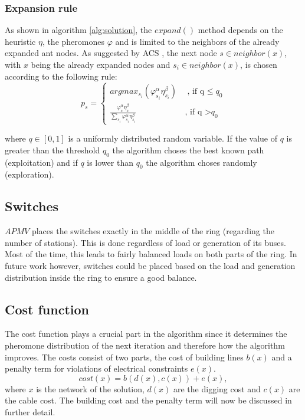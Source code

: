 \subsubsection{Expansion rule}
As shown in algorithm \ref{alg:solution}, the $expand()$ method depends on the heuristic $\eta$, the pheromones $\varphi$ and is limited to the neighbors of the already expanded ant nodes. As suggested by ACS \cite{ant_coloy_system}, the next node $s \in neighbor(x)$, with $x$ being the already expanded nodes and $s_i \in neighbor(x)$, is chosen according to the following rule:
$$p_s = \begin{cases}
	argmax_{s_i}(\varphi_{s_i}^\alpha \eta_{s_i}^\beta) & \, \text{, if q $\leq$} q_0\\
	\frac{\varphi_s^\alpha\eta_s^\beta}{\sum_{s_i}\varphi_{s_i}^\alpha\eta_{s_i}^\beta} & \, \text{, if q >} q_0
\end{cases}$$

where $q \in [0,1]$ is a uniformly distributed random variable. If the value of $q$ is greater than the threshold $q_0$ the algorithm choses the best known path (exploitation) and if $q$ is lower than $q_0$ the algorithm choses randomly (exploration). 

\subsection{Switches}
$APMV$ places the switches exactly in the middle of the ring (regarding the number of stations). This is done regardless of load or generation of its buses. Most of the time, this leads to fairly balanced loads on both parts of the ring. In future work however, switches could be placed based on the load and generation distribution inside the ring to ensure a good balance.

\subsection{Cost function}
The cost function plays a crucial part in the algorithm since it determines the pheromone distribution of the next iteration and therefore how the algorithm improves. The costs consist of two parts, the cost of building lines $b(x)$ and a penalty term for violations of electrical constraints $e(x)$.
$$cost(x) = b(d(x), c(x)) + e(x),$$
where $x$ is the network of the solution, $d(x)$ are the digging cost and $c(x)$ are the cable cost. The building cost and the penalty term will now be discussed in further detail.


